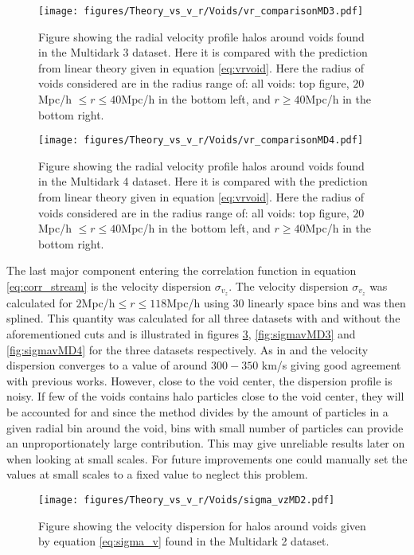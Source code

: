 \begin{figure}[H]
    \texttt{[image: figures/Theory\_vs\_v\_r/Voids/vr\_comparisonMD3.pdf]}
    \caption{Figure showing the radial velocity profile halos around voids found in the Multidark 3 dataset. Here it is compared with the prediction from linear theory given in equation \ref{eq:vrvoid}. Here the radius of voids considered are in the radius range of: all voids: top figure, $20$Mpc/h $\leq r\leq 40$Mpc/h in the bottom left, and $r\geq 40$Mpc/h in the bottom right.}
    \label{fig:vrMD3}
\end{figure}

\begin{figure}[H]
    \texttt{[image: figures/Theory\_vs\_v\_r/Voids/vr\_comparisonMD4.pdf]}
    \caption{Figure showing the radial velocity profile halos around voids found in the Multidark 4 dataset. Here it is compared with the prediction from linear theory given in equation \ref{eq:vrvoid}. Here the radius of voids considered are in the radius range of: all voids: top figure, $20$Mpc/h $\leq r\leq 40$Mpc/h in the bottom left, and $r\geq 40$Mpc/h in the bottom right.}
    \label{fig:vrMD4}
\end{figure}
The last major component entering the correlation function in equation \ref{eq:corr_stream} is the velocity dispersion $\sigma_{v_z}$. The velocity dispersion $\sigma_{v_z}$ was calculated for $2$Mpc/h$\leq r\leq 118$Mpc/h using $30$ linearly space bins and was then splined. This quantity was calculated for all three datasets with and without the aforementioned cuts and is illustrated in figures \ref{fig:sigmavMD2}, \ref{fig:sigmavMD3} and \ref{fig:sigmavMD4} for the three datasets respectively. As in \cite{Nadathur_corr} and \cite{Achitouv_streaming} the velocity dispersion converges to a value of around $300-350$ km/s giving good agreement with previous works. However, close to the void center, the dispersion profile is noisy. If few of the voids contains halo particles close to the void center, they will be accounted for and since the method divides by the amount of particles in a given radial bin around the void, bins with small number of particles can provide an unproportionately large contribution. This may give unreliable results later on when looking at small scales. For future improvements one could manually set the values at small scales to a fixed value to neglect this problem.
\begin{figure}[H]
    \texttt{[image: figures/Theory\_vs\_v\_r/Voids/sigma\_vzMD2.pdf]}
    \caption{Figure showing the velocity dispersion for halos around voids given by equation \ref{eq:sigma_v} found in the Multidark 2 dataset.}
    \label{fig:sigmavMD2}
\end{figure}

